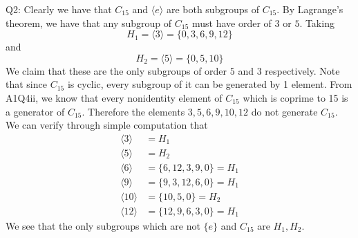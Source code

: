 \documentclass[letterpaper]{article}
\newcommand{\lan}{\langle}
\newcommand{\ran}{\rangle}
\newcommand{\inn}[1]{\lan#1\ran}
\begin{document}
\noindent
Q2: Clearly we have that $C_{15}$ and $\inn{e}$ are both subgroups of $C_{15}$. By Lagrange's theorem, we have that any subgroup of $C_{15}$ must have order of $3$ or $5$. Taking $$H_1 = \inn{3} = \{0,3,6,9,12 \}$$ and $$H_2 = \inn{5} = \{0,5,10\}$$
We claim that these are the only subgroups of order $5$ and $3$ respectively. Note that since $C_{15}$ is cyclic, every subgroup of it can be generated by 1 element. From A1Q4ii, we know that every nonidentity element of $C_{15}$ which is coprime to 15 is a generator of $C_{15}$. Therefore the elements $3,5,6,9,10,12$ do not generate $C_{15}$. We can verify through simple computation that
\begin{align*}
    \inn{3} & = H_1
    \\ \inn{5} &= H_2
    \\ \inn{6} &= \{6,12,3,9,0\} = H_1
    \\ \inn{9} & = \{9,3,12,6,0\} = H_1
    \\ \inn{10} & = \{ 10,5,0\} = H_2
    \\ \inn{12} & = \{12,9,6,3,0\} = H_1
\end{align*}
We see that the only subgroups which are not $\{e\}$ and $C_{15}$ are $H_1,H_2$.
\end{document}
